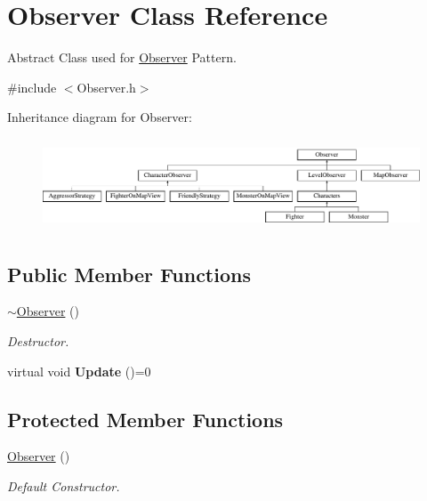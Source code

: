 \hypertarget{class_observer}{}\section{Observer Class Reference}
\label{class_observer}


Abstract Class used for \hyperlink{class_observer}{Observer} Pattern.  




{\ttfamily \#include $<$Observer.\+h$>$}

Inheritance diagram for Observer\+:\begin{figure}[H]
\begin{center}
\leavevmode
\includegraphics[height=2.745098cm]{class_observer}
\end{center}
\end{figure}
\subsection*{Public Member Functions}
\begin{DoxyCompactItemize}
\item 
\hypertarget{class_observer_a450645e61c136826f09940a1334c7f34}{}\label{class_observer_a450645e61c136826f09940a1334c7f34} 
\hyperlink{class_observer_a450645e61c136826f09940a1334c7f34}{$\sim$\+Observer} ()
\begin{DoxyCompactList}\small\item\em Destructor. \end{DoxyCompactList}\item 
\hypertarget{class_observer_a3c7c1dd5ca0f7bdb0e05098d1b7aac41}{}\label{class_observer_a3c7c1dd5ca0f7bdb0e05098d1b7aac41} 
virtual void {\bfseries Update} ()=0
\end{DoxyCompactItemize}
\subsection*{Protected Member Functions}
\begin{DoxyCompactItemize}
\item 
\hypertarget{class_observer_a19c43f80a38a332a6f694783df3c9835}{}\label{class_observer_a19c43f80a38a332a6f694783df3c9835} 
\hyperlink{class_observer_a19c43f80a38a332a6f694783df3c9835}{Observer} ()
\begin{DoxyCompactList}\small\item\em Default Constructor. \end{DoxyCompactList}\end{DoxyCompactItemize}


